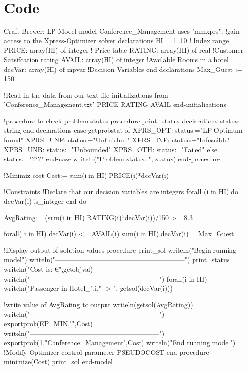 \documentclass[paper=a4, fontsize=11pt]{scrartcl} %
\begin{document}
\appendix
\section{Code}
\begin{sexylisting}{Craft Brewer: LP Model}
model Conference_Management
uses "mmxprs"; !gain access to the Xpress-Optimizer solver
	declarations
		HI = 1..10                       	! Index range
		PRICE: array(HI) of integer         ! Price table
		RATING: array(HI) of real			!Customer Satsifcation rating
		AVAIL: array(HI) of integer			!Available Rooms in a hotel
		decVar: array(HI) of mpvar          !Decision Variables
	end-declarations
	Max_Guest := 150
	
	!Read in the data from our text file
	initializations from 'Conference_Management.txt'
		PRICE
		RATING
		AVAIL
	end-initializations
	
	!procedure to check problem status
	procedure print_status
		declarations
			status: string
		end-declarations
		case getprobstat of
		XPRS_OPT: status:="LP Optimum found"
		XPRS_UNF: status:="Unfinished"
		XPRS_INF: status:="Infeasible"
		XPRS_UNB: status:="Unbounded"
		XPRS_OTH: status:="Failed"
		else status:="???"
		end-case
		writeln("Problem status: ", status)
	end-procedure
	 
	!Minimiz cost
	Cost:= sum(i in HI) PRICE(i)*decVar(i)
	 
	!Constraints
	!Declare that our decision variables are integers
	forall (i in HI) do 
		decVar(i) is_integer
	end-do
	
	AvgRating:= (sum(i in HI) RATING(i)*decVar(i))/150 >= 8.3
			 
	forall( i in HI)
		decVar(i) <= AVAIL(i)	 	
	sum(i in HI) decVar(i)	= Max_Guest
		
	!Display output of solution values
	procedure print_sol	
		writeln("Begin running model") 	
		writeln("---------------------------------------------------------")
		print_status
		writeln("Cost is: €",getobjval)
		writeln("---------------------------------------------------------")
		forall(i in HI) 
			writeln("Passenger in Hotel_",i," -> ", getsol(decVar(i)))
			
		!write value of AvgRating to output
		writeln(getsol(AvgRating))
		writeln("---------------------------------------------------------")
		exportprob(EP_MIN,"",Cost)
		writeln("---------------------------------------------------------")
		exportprob(1,"Conference_Management",Cost)
		writeln("End running model")
		!Modify Optimizer control parameter PSEUDOCOST
	end-procedure 
	minimize(Cost)
	print_sol	
end-model
\end{sexylisting}
\end{document}
